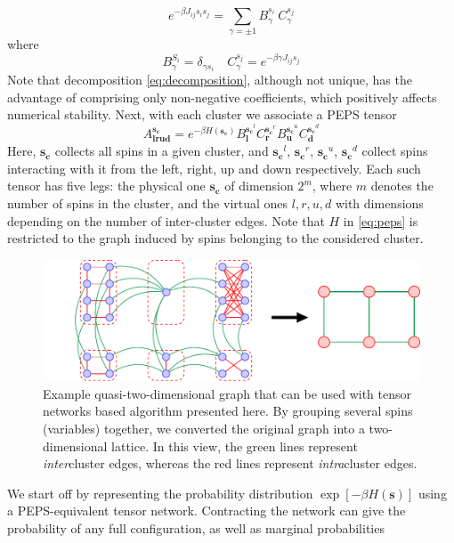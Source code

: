 \begin{equation}
  e^{-\beta J_{ij}s_i s_j} = \sum_{\gamma = \pm 1} B^{s_{i\phantom{j}}}_\gamma C^{s_j}_\gamma
\end{equation}
where
\begin{equation}
  \label{eq:decomposition}
  B^{S_i}_\gamma = \delta_{\gamma s_i} \quad C^{s_j}_\gamma = e^{-\beta \gamma J_{ij} s_j}
\end{equation}
Note that decomposition \eqref{eq:decomposition}, although not unique, has the
advantage of comprising only non-negative coefficients, which positively
affects numerical stability. Next, with each cluster we associate a PEPS tensor
\begin{equation}
  \label{eq:peps}
  A^{\mathbf{s_c}}_{\mathbf{lrud}} = e^{-\beta H(\mathbf{s_c})} B^{\mathbf{s_c}^l}_\mathbf{l}C^{\mathbf{s_c}^r}_\mathbf{r}B^{\mathbf{s_c}^u}_\mathbf{u}C^{\mathbf{s_c}^d}_\mathbf{d}
\end{equation}
Here, $\mathbf{s_c}$ collects all spins in a given cluster, and
  $\mathbf{s_c}^l$, $\mathbf{s_c}^r$, $\mathbf{s_c}^u$, $\mathbf{s_c}^d$ collect
    spins interacting with it from the left, right, up and down respectively. Each
    such tensor has five legs: the physical one $\mathbf{s_c}$ of dimension $2^m$,
    where $m$ denotes the number of spins in the cluster, and the virtual ones $l,
  r, u, d$ with dimensions depending on the number of inter-cluster edges. Note
    that $H$ in \eqref{eq:peps} is restricted to the graph induced by spins
belonging to the considered cluster. 

\begin{figure}
  \centering
  \includegraphics[width=\textwidth]{figures/clustering.pdf}
  \caption{Example quasi-two-dimensional graph that can be used with tensor networks based
    algorithm presented here. By grouping several spins (variables) together, we
    converted the original graph into a two-dimensional lattice. In this view, the
    green lines represent \emph{inter}cluster edges, whereas the red lines
    represent \emph{intra}cluster edges.} \label{fig:quasi2d}
\end{figure}
We start off by representing the probability distribution $\exp[-\beta
    H(\mathbf{s})]$ using a PEPS-equivalent tensor network. Contracting the network
    can give the probability of any full configuration, as well as marginal
    probabilities

